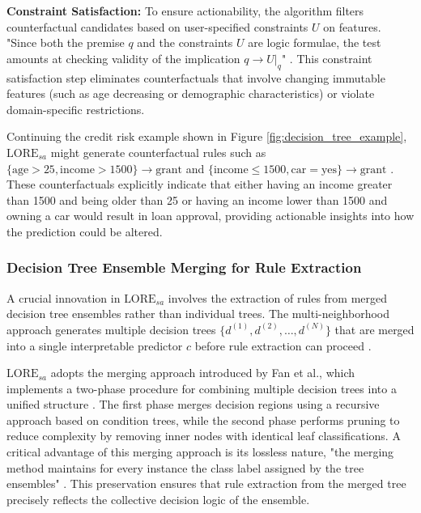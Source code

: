\textbf{Constraint Satisfaction:} To ensure actionability, the algorithm filters counterfactual candidates based on user-specified constraints $U$ on features. "Since both the premise $q$ and the constraints $U$ are logic formulae, the test amounts at checking validity of the implication $q \rightarrow U|_q$" \cite{guidotti2022stable}. This constraint satisfaction step eliminates counterfactuals that involve changing immutable features (such as age decreasing or demographic characteristics) or violate domain-specific restrictions.

Continuing the credit risk example shown in Figure \ref{fig:decision_tree_example}, $\text{LORE}_{sa}$ might generate counterfactual rules such as $\{\text{age}>25, \text{income} > 1500\} \rightarrow \text{grant}$ and $\{\text{income} \leq1500, \text{car} = \text{yes}\} \rightarrow \text{grant}$ \cite{guidotti2022stable}. These counterfactuals explicitly indicate that either having an income greater than 1500 and being older than 25 or having an income lower than 1500 and owning a car would result in loan approval, providing actionable insights into how the prediction could be altered.

\subsubsection{Decision Tree Ensemble Merging for Rule Extraction}

A crucial innovation in $\text{LORE}_{sa}$ involves the extraction of rules from merged decision tree ensembles rather than individual trees. The multi-neighborhood approach generates multiple decision trees $\{d^{(1)}, d^{(2)}, \ldots, d^{(N)}\}$ that are merged into a single interpretable predictor $c$ before rule extraction can proceed \cite{guidotti2022stable}.

$\text{LORE}_{sa}$ adopts the merging approach introduced by Fan et al.\cite{Fan2020ClassificationAV}, which implements a two-phase procedure for combining multiple decision trees into a unified structure \cite{guidotti2022stable}. The first phase merges decision regions using a recursive approach based on condition trees, while the second phase performs pruning to reduce complexity by removing inner nodes with identical leaf classifications.
% 
A critical advantage of this merging approach is its lossless nature, "the merging method maintains for every instance the class label assigned by the tree ensembles" \cite{guidotti2022stable}. This preservation ensures that rule extraction from the merged tree precisely reflects the collective decision logic of the ensemble.

